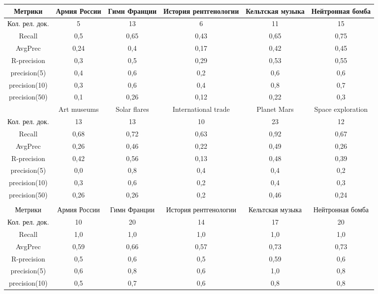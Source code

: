\begin{table}[ht]
\begin{adjustbox}{width=0.9\textwidth}
\begin{tabular}{| c | c | c | c | c | c |}
		\hline
		Метрики & Армия России & Гимн Франции & История рентгенологии &  Кельтская музыка &  Нейтронная бомба \\
		\hline
		Кол. рел. док. & 5 & 13 & 6 & 11 & 15  \\
		\hline
		Recall & 0,5 & 0,65 & 0,43 & 0,65 & 0,75 \\
		\hline
		AvgPrec & 0,24 & 0,4 & 0,17 & 0,42 & 0,45  \\
		\hline
		R-precision & 0,3 & 0,5 & 0,29 & 0,53 & 0,55  \\
		\hline
		precision(5) & 0,4 & 0,6 & 0,2 & 0,6 & 0,6  \\
		\hline
		precision(10) & 0,3 & 0,6 & 0,4 & 0,8 & 0,7  \\
		\hline
		precision(50) & 0,1 & 0,26 & 0,12 & 0,22 & 0,3  \\
		\hline
		& Art museums & Solar flares & International trade &  Planet Mars &  Space exploration \\
		\hline
		Кол. рел. док. & 13 & 13 & 10 & 23 & 12  \\
		\hline
		Recall & 0,68 & 0,72 & 0,63 & 0,92 & 0,67 \\
		\hline
		AvgPrec & 0,26 & 0,46 & 0,22 & 0,49 & 0,26  \\
		\hline
		R-precision & 0,42 & 0,56 & 0,13 & 0,48 & 0,39  \\
		\hline
		precision(5) & 0,0 & 0,8 & 0,4 & 0,4 & 0,2  \\
		\hline
		precision(10) & 0,3 & 0,6 & 0,2 & 0,4 & 0,3  \\
		\hline
		precision(50) & 0,26 & 0,26 & 0,2 & 0,46 & 0,24  \\
		\hline
		\\
		\hline
		Метрики & Армия России & Гимн Франции & История рентгенологии &  Кельтская музыка &  Нейтронная бомба \\
		\hline
		Кол. рел. док. & 10 & 20 & 14 & 17 & 20  \\
		\hline
		Recall & 1,0 & 1,0 & 1,0 & 1,0 & 1,0 \\
		\hline
		AvgPrec & 0,59 & 0,66 & 0,57 & 0,73 & 0,73  \\
		\hline
		R-precision & 0,5 & 0,6 & 0,5 & 0,59 & 0,6  \\
		\hline
		precision(5) & 0,6 & 0,8 & 0,6 & 1,0 & 0,8  \\
		\hline
		precision(10) & 0,5 & 0,7 & 0,6 & 0,8 & 0,8  \\
		\hline

\end{tabular}
\end{adjustbox}
\end{table}
